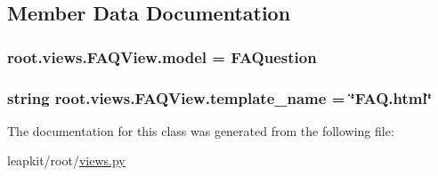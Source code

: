 \subsection{Member Data Documentation}
\hypertarget{classroot_1_1views_1_1_f_a_q_view_aa7ccddd0da9cc4dbd9d68923cb8f6a73}{
\subsubsection[{model}]{\setlength{\rightskip}{0pt plus 5cm}root.\-views.\-F\-A\-Q\-View.\-model = {\bf F\-A\-Question}\hspace{0.3cm}{\ttfamily [static]}}}\label{classroot_1_1views_1_1_f_a_q_view_aa7ccddd0da9cc4dbd9d68923cb8f6a73}
\hypertarget{classroot_1_1views_1_1_f_a_q_view_a342d1013351cfcbd46cbfd65cefa9e8d}{
\subsubsection[{template\-\_\-name}]{\setlength{\rightskip}{0pt plus 5cm}string root.\-views.\-F\-A\-Q\-View.\-template\-\_\-name = \char`\"{}F\-A\-Q.\-html\char`\"{}\hspace{0.3cm}{\ttfamily [static]}}}\label{classroot_1_1views_1_1_f_a_q_view_a342d1013351cfcbd46cbfd65cefa9e8d}


The documentation for this class was generated from the following file\-:\begin{DoxyCompactItemize}
\item 
leapkit/root/\hyperlink{root_2views_8py}{views.\-py}\end{DoxyCompactItemize}
